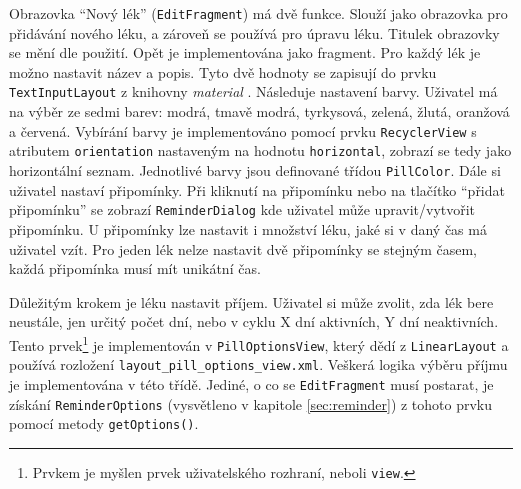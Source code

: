 \documentclass[../TakeYourPill.tex]{subfiles}
\begin{document}
Obrazovka \enquote{Nový lék} (\texttt{EditFragment}) má dvě funkce. Slouží jako obrazovka pro přidávání nového léku, a zároveň se používá pro úpravu léku. Titulek obrazovky se mění dle použití. Opět je implementována jako fragment. Pro každý lék je možno nastavit název a popis. Tyto dvě hodnoty se zapisují do prvku \texttt{TextInputLayout} z knihovny \textit{material} \cite{materialdesign-android}. Následuje nastavení barvy. Uživatel má na výběr ze sedmi barev: modrá, tmavě modrá, tyrkysová, zelená, žlutá, oranžová a červená. Vybírání barvy je implementováno pomocí prvku \texttt{RecyclerView} s atributem \texttt{orientation} nastaveným na hodnotu \texttt{horizontal}, zobrazí se tedy jako horizontální seznam. Jednotlivé barvy jsou definované třídou \texttt{PillColor}. Dále si uživatel nastaví připomínky. Při kliknutí na připomínku nebo na tlačítko \enquote{přidat připomínku} se zobrazí \texttt{ReminderDialog} kde uživatel může upravit/vytvořit připomínku. U připomínky lze nastavit i množství léku, jaké si v daný čas má uživatel vzít. Pro jeden lék nelze nastavit dvě připomínky se stejným časem, každá připomínka musí mít unikátní čas. 

Důležitým krokem je léku nastavit příjem. Uživatel si může zvolit, zda lék bere neustále, jen určitý počet dní, nebo v cyklu X dní aktivních, Y dní neaktivních. Tento prvek\footnote{Prvkem je myšlen prvek uživatelského rozhraní, neboli \texttt{view}.} je implementován v \texttt{PillOptionsView}, který dědí z \texttt{LinearLayout} a používá rozložení \texttt{layout\_pill\_options\_view.xml}. Veškerá logika výběru příjmu je implementována v této třídě. Jediné, o co se \texttt{EditFragment} musí postarat, je získání \texttt{ReminderOptions} (vysvětleno v kapitole \ref{sec:reminder}) z tohoto prvku pomocí metody \texttt{getOptions()}.
\end{document}
